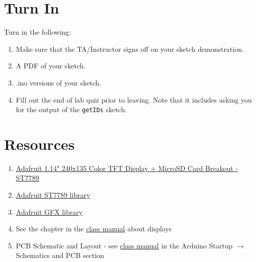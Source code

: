 \section{Turn In}
Turn in the following:
\begin{enumerate}
    \item Make sure that the TA/Instructor signs off on your sketch demonstration.
    \item A PDF of your sketch.
    \item .ino versions of your sketch.
    \item Fill out the end of lab quiz prior to leaving. Note that it includes asking you 
            for the output of the \lstinline$getIDs$ sketch. 
\end{enumerate}

\section{Resources}\label{sec:displaysresources}
\begin{enumerate}
    \item \href{https://www.adafruit.com/product/4383}{Adafruit 1.14" 240x135 Color TFT Display + MicroSD Card Breakout - ST7789}
    \item \href{https://www.arduino.cc/reference/en/libraries/adafruit-st7735-and-st7789-library/}{Adafruit ST7789 library}
    \item \href{https://learn.adafruit.com/adafruit-gfx-graphics-library}{Adafruit GFX library}
    \item See the chapter in the \href{https://github.com/semcneil/Fundamentals-of-Microcontrollers-Manual}{class manual} about displays
    \item PCB Schematic and Layout - see 
            \href{https://github.com/semcneil/Fundamentals-of-Microcontrollers-Manual}{class manual} 
            in the Arduino Startup $\rightarrow$ Schematics and PCB section
\end{enumerate}

